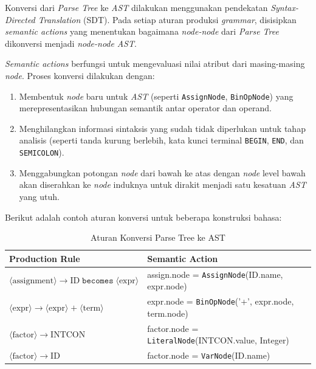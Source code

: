 ﻿\documentclass[12pt,a4paper]{article}
\begin{document}
Konversi dari \textit{Parse Tree} ke \textit{AST} dilakukan menggunakan pendekatan \textit{Syntax-Directed Translation} (SDT). Pada setiap aturan produksi \textit{grammar}, disisipkan \textit{semantic actions} yang menentukan bagaimana \textit{node-node} dari \textit{Parse Tree} dikonversi menjadi \textit{node-node} \textit{AST}.

\textit{Semantic actions} berfungsi untuk mengevaluasi nilai atribut dari masing-masing \textit{node}. Proses konversi dilakukan dengan:
\begin{enumerate}
    \item Membentuk \textit{node} baru untuk \textit{AST} (seperti \texttt{AssignNode}, \texttt{BinOpNode}) yang merepresentasikan hubungan semantik antar operator dan operand.
    \item Menghilangkan informasi sintaksis yang sudah tidak diperlukan untuk tahap analisis (seperti tanda kurung berlebih, kata kunci terminal \texttt{BEGIN}, \texttt{END}, dan \texttt{SEMICOLON}).
    \item Menggabungkan potongan \textit{node} dari bawah ke atas dengan \textit{node} level bawah akan diserahkan ke \textit{node} induknya untuk dirakit menjadi satu kesatuan \textit{AST} yang utuh.
\end{enumerate}

Berikut adalah contoh aturan konversi untuk beberapa konstruksi bahasa:

\begin{table}[H]
\centering
\caption{Aturan Konversi Parse Tree ke AST}
\begin{tabular}{|l|l|}
\hline
\textbf{Production Rule} & \textbf{Semantic Action} \\
\hline
$\langle\text{assignment}\rangle \rightarrow \text{ID} \; \texttt{becomes} \; \langle\text{expr}\rangle$ & assign.node = \texttt{AssignNode}(ID.name, expr.node) \\
\hline
$\langle\text{expr}\rangle \rightarrow \langle\text{expr}\rangle \; \texttt{+} \; \langle\text{term}\rangle$ & expr.node = \texttt{BinOpNode}('+', expr.node, term.node) \\
\hline
$\langle\text{factor}\rangle \rightarrow \text{INTCON}$ & factor.node = \texttt{LiteralNode}(INTCON.value, Integer) \\
\hline
$\langle\text{factor}\rangle \rightarrow \text{ID}$ & factor.node = \texttt{VarNode}(ID.name) \\
\hline
\end{tabular}
\end{table}
\end{document}
